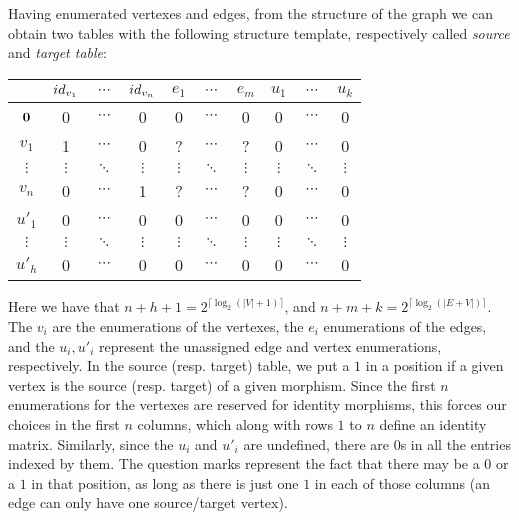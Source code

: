 \documentclass[preliminary,copyright,creativecommons,sharealike,noncommercial]{eptcs}
\begin{document}
Having enumerated vertexes and edges, from the structure of 
the graph we can obtain two tables with the following structure 
template, respectively called \emph{source} and \emph{target table}:
%
%
\begin{center}\scriptsize
  \begin{tabular}{c|ccccccccc}
                  & $id_{v_1}$ & $\cdots$ & $id_{v_n}$ & $e_1$     & $\cdots$ & $e_m$    & $u_1$     & $\cdots$ & $u_k$   \\
  \hline
  $\textbf{0}$   & 0                 & $\cdots$ & 0                  & 0             & $\cdots$ & 0             & 0             & $\cdots$ & 0             \\
  $v_1$      & 1                 & $\cdots$ & 0                  & ?             & $\cdots$ & ?             & 0             & $\cdots$ & 0             \\
  $\vdots $ & $\vdots$     & $\ddots$ & $\vdots$      & $\vdots$ & $\ddots$ & $\vdots$ & $\vdots$ & $\ddots$ & $\vdots$  \\
  $v_n$      & 0                 & $\cdots$ & 1                  & ?             & $\cdots$ & ?             & 0             & $\cdots$ & 0             \\
  $u'_1$     & 0                 & $\cdots$ & 0                  & 0             & $\cdots$ & 0             & 0             & $\cdots$ & 0             \\
  $\vdots$  & $\vdots$     & $\ddots$ & $\vdots$      & $\vdots$ & $\ddots$ & $\vdots$ & $\vdots$ & $\ddots$ & $\vdots$ \\
  $u'_h$     & 0                 & $\cdots$ & 0                  & 0             & $\cdots$ &0             & 0             & $\cdots$ & 0             \\
  \end{tabular}
\end{center}
%
Here we have that $n+h+1 = 2^{\lceil \log_2 (|V|+1) \rceil}$, 
and $n+m+k = 2^{\lceil \log_2 (|E+V|) \rceil}$. The $v_i$ are 
the enumerations of the vertexes, the $e_i$ enumerations 
of the edges, and the $u_i, u'_i$ represent the unassigned 
edge and vertex enumerations, respectively. In the source (resp. target) 
table, we put a $1$ in a position if a given vertex is the source (resp. target)
of a given morphism. Since the first $n$ enumerations for the 
vertexes are reserved for identity morphisms, this forces our 
choices in the first $n$ columns, which along with rows $1$ to $n$ 
define an identity matrix. Similarly, since the $u_i$ and 
$u'_i$ are undefined, there are $0$s in all the entries indexed by them.
The question marks represent the fact that there may be a $0$ or a $1$
in that position, as long as there is just one $1$ in each of those 
columns (an edge can only have one source/target vertex). 
%
%
%
\end{document}

